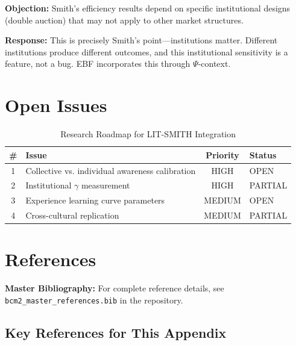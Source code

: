 \textbf{Objection:} Smith's efficiency results depend on specific institutional
designs (double auction) that may not apply to other market structures.

\textbf{Response:} This is precisely Smith's point---institutions matter.
Different institutions produce different outcomes, and this institutional
sensitivity is a feature, not a bug. EBF incorporates this through $\Psi$-context.


\section{Open Issues}
\label{sec:vs-open}

\begin{table}[htbp]
\centering
\caption{Research Roadmap for LIT-SMITH Integration}
\label{tab:vs-roadmap}
\renewcommand{\arraystretch}{1.3}
\begin{tabular}{@{}clcl@{}}
\toprule
\textbf{\#} & \textbf{Issue} & \textbf{Priority} & \textbf{Status} \\
\midrule
1 & Collective vs. individual awareness calibration & HIGH & OPEN \\
2 & Institutional $\gamma$ measurement & HIGH & PARTIAL \\
3 & Experience learning curve parameters & MEDIUM & OPEN \\
4 & Cross-cultural replication & MEDIUM & PARTIAL \\
\bottomrule
\end{tabular}
\end{table}


\section{References}
\label{sec:vs-references}

\begin{tcolorbox}[colback=blue!5!white, colframe=blue!75!black]
\textbf{Master Bibliography:} For complete reference details, see
\texttt{bcm2\_master\_references.bib} in the repository.
\nocite{bcm_master}
\end{tcolorbox}

\subsection{Key References for This Appendix}

